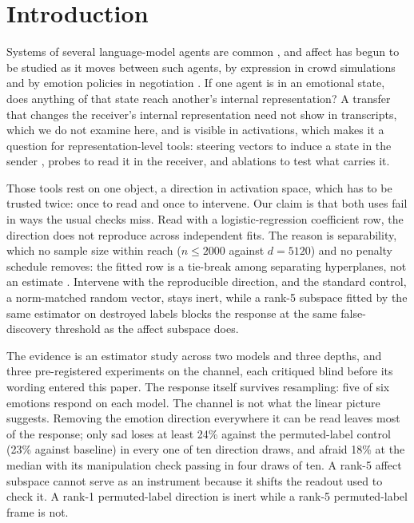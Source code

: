 \documentclass[11pt]{article}
\begin{document}
\section{Introduction}
Systems of several language-model agents are common \citep{guo2024multiagent}, and affect has begun to be studied as it moves between such agents, by expression in crowd simulations \citep{durupinar2026affect} and by emotion policies in negotiation \citep{long2025evoemo}. If one agent is in an emotional state, does anything of that state reach another's internal representation? A transfer that changes the receiver's internal representation need not show in transcripts, which we do not examine here, and is visible in activations, which makes it a question for representation-level tools: steering vectors to induce a state in the sender \citep{turner2023actadd,rimsky2023caa,zou2023repe,li2023iti,sofroniew2026emotion,jeong2026emotion}, probes to read it in the receiver, and ablations to test what carries it.

Those tools rest on one object, a direction in activation space, which has to be trusted twice: once to read and once to intervene. Our claim is that both uses fail in ways the usual checks miss. Read with a logistic-regression coefficient row, the direction does not reproduce across independent fits. The reason is separability, which no sample size within reach ($n \le 2000$ against $d = 5120$) and no penalty schedule removes: the fitted row is a tie-break among separating hyperplanes, not an estimate \citep{rosset2004margin,soudry2018implicit,marks2023geometry}. Intervene with the reproducible direction, and the standard control, a norm-matched random vector, stays inert, while a rank-5 subspace fitted by the same estimator on destroyed labels blocks the response at the same false-discovery threshold as the affect subspace does.

The evidence is an estimator study across two models and three depths, and three pre-registered experiments on the channel, each critiqued blind before its wording entered this paper. The response itself survives resampling: five of six emotions respond on each model. The channel is not what the linear picture suggests. Removing the emotion direction everywhere it can be read leaves most of the response; only sad loses at least 24\% against the permuted-label control (23\% against baseline) in every one of ten direction draws, and afraid 18\% at the median with its manipulation check passing in four draws of ten. A rank-5 affect subspace cannot serve as an instrument because it shifts the readout used to check it. A rank-1 permuted-label direction is inert while a rank-5 permuted-label frame is not.
\end{document}
